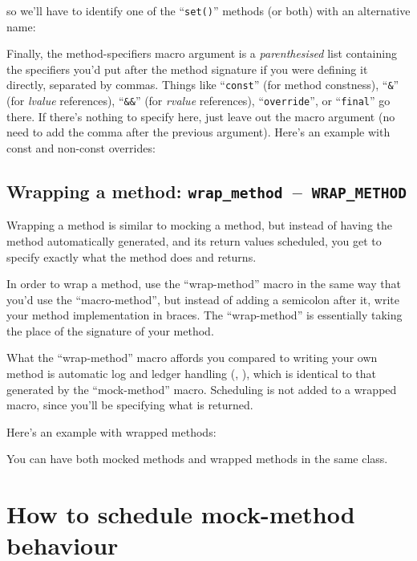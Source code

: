 \documentclass[twoside, a4paper, article]{memoir}
\newcommand*\testudocolor{\color{red!80!blue}}
\newcommand*\testudo[1]{\texttt{\testudocolor{}#1}}
\newcommand*\testudopair[2]{\testudo{#1}~--~\testudo{#2}}
\newcommand\subsectiontestudopair[3]{%
  \subsection[#1]{#1: \testudopair{#2}{#3}}}
\providecommand\typesetexample[1]{%
}
\begin{document}
\typesetexample{mock-class-name-clash}

so we'll have to identify one of the ``\texttt{set()}'' methods (or both) with
an alternative name:

\typesetexample{mock-class-name-clash-avoided}

Finally, the method-specifiers macro argument is a \emph{parenthesised} list
containing the specifiers you'd put after the method signature if you were
defining it directly, separated by commas.  Things like ``\texttt{const}'' (for
method constness), ``\texttt{\&}'' (for \emph{lvalue} references),
``\texttt{\&\&}'' (for \emph{rvalue} references), ``\texttt{override}'', or
``\texttt{final}'' go there.  If there's nothing to specify here, just leave
out the macro argument (no need to add the comma after the previous argument).
Here's an example with const and non-const overrides:

\typesetexample{mock-class-mock-method}


\subsectiontestudopair{Wrapping a method}{wrap\_method}{WRAP\_METHOD}
\label{sec:wrapping-method}

Wrapping a method is similar to mocking a method, but instead of having the
method automatically generated, and its return values scheduled, you get to
specify exactly what the method does and returns.

In order to wrap a method, use the ``wrap-method'' macro in the same way that
you'd use the ``macro-method'', but instead of adding a semicolon after it,
write your method implementation in braces.  The ``wrap-method'' is essentially
taking the place of the signature of your method.

What the ``wrap-method'' macro affords you compared to writing your own method
is automatic log and ledger handling (,
), which is identical to that generated by
the ``mock-method'' macro.  Scheduling is not added to a wrapped macro, since
you'll be specifying what is returned.

Here's an example with wrapped methods:

\typesetexample{mock-class-wrap-method}

You can have both mocked methods and wrapped methods in the same class.


\section{How to schedule mock-method behaviour}
\label{sec:schedule-mock-method}
\end{document}
